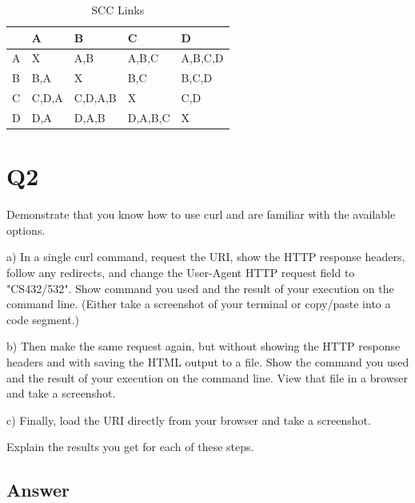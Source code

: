 \documentclass[12pt]{article}
\begin{document}
\begin{table}[h]
\centering
\caption{SCC Links}
\label{tbl:scclinks}
\begin{tabular}{|l|l|l|l|l|}
\hline
\textbf{ } & \textbf{A} & \textbf{B} & \textbf{C} & \textbf{D} \\ \hline
A & X & A,B & A,B,C & A,B,C,D \\ \hline
B & B,A & X & B,C & B,C,D \\ \hline
C & C,D,A & C,D,A,B & X & C,D \\ \hline
D & D,A & D,A,B & D,A,B,C & X \\ \hline
\end{tabular}
\end{table}

\section*{Q2}
Demonstrate that you know how to use curl and are familiar with the available options.



a) In a single curl command, request the URI, show the HTTP response headers, follow any redirects, and change the User-Agent HTTP request field to "CS432/532". Show command you used and the result of your execution on the command line. (Either take a screenshot of your terminal or copy/paste into a code segment.)

b) Then make the same request again, but without showing the HTTP response headers and with saving the HTML output to a file. Show the command you used and the result of your execution on the command line. View that file in a browser and take a screenshot.

c) Finally, load the URI directly from your browser and take a screenshot.

Explain the results you get for each of these steps.
\pagebreak
\subsection*{Answer}
\end{document}
